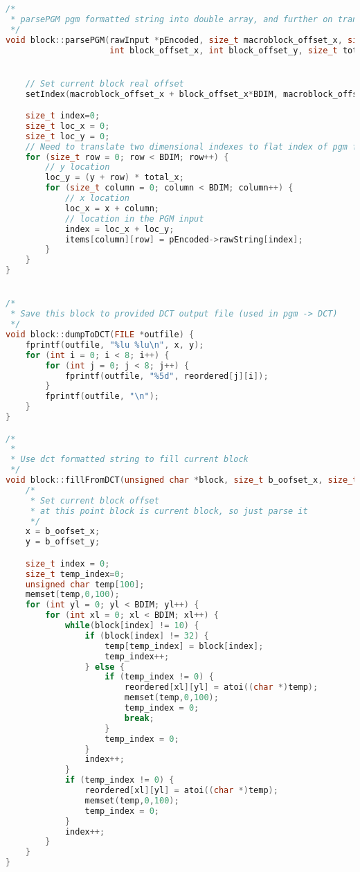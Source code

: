\documentclass{report}
\begin{document}
\begin{lstlisting}[language=C++]
/*
 * parsePGM pgm formatted string into double array, and further on transform to DCT
 */
void block::parsePGM(rawInput *pEncoded, size_t macroblock_offset_x, size_t macroblock_offset_y,
                     int block_offset_x, int block_offset_y, size_t total_x) {


    // Set current block real offset
    setIndex(macroblock_offset_x + block_offset_x*BDIM, macroblock_offset_y + block_offset_y*BDIM);

    size_t index=0;
    size_t loc_x = 0;
    size_t loc_y = 0;
    // Need to translate two dimensional indexes to flat index of pgm file
    for (size_t row = 0; row < BDIM; row++) {
        // y location
        loc_y = (y + row) * total_x;
        for (size_t column = 0; column < BDIM; column++) {
            // x location
            loc_x = x + column;
            // location in the PGM input
            index = loc_x + loc_y;
            items[column][row] = pEncoded->rawString[index];
        }
    }
}


/*
 * Save this block to provided DCT output file (used in pgm -> DCT)
 */
void block::dumpToDCT(FILE *outfile) {
    fprintf(outfile, "%lu %lu\n", x, y);
    for (int i = 0; i < 8; i++) {
        for (int j = 0; j < 8; j++) {
            fprintf(outfile, "%5d", reordered[j][i]);
        }
        fprintf(outfile, "\n");
    }
}

/*
 *
 * Use dct formatted string to fill current block
 */
void block::fillFromDCT(unsigned char *block, size_t b_oofset_x, size_t b_offset_y) {
    /*
     * Set current block offset
     * at this point block is current block, so just parse it
     */
    x = b_oofset_x;
    y = b_offset_y;

    size_t index = 0;
    size_t temp_index=0;
    unsigned char temp[100];
    memset(temp,0,100);
    for (int yl = 0; yl < BDIM; yl++) {
        for (int xl = 0; xl < BDIM; xl++) {
            while(block[index] != 10) {
                if (block[index] != 32) {
                    temp[temp_index] = block[index];
                    temp_index++;
                } else {
                    if (temp_index != 0) {
                        reordered[xl][yl] = atoi((char *)temp);
                        memset(temp,0,100);
                        temp_index = 0;
                        break;
                    }
                    temp_index = 0;
                }
                index++;
            }
            if (temp_index != 0) {
                reordered[xl][yl] = atoi((char *)temp);
                memset(temp,0,100);
                temp_index = 0;
            }
            index++;
        }
    }
}



\end{lstlisting}
\end{document}
